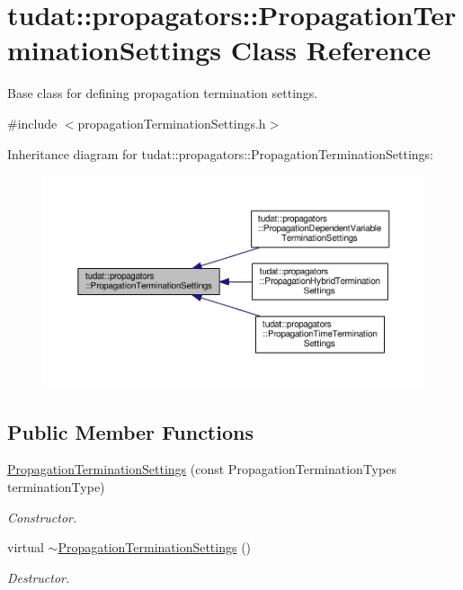 \hypertarget{classtudat_1_1propagators_1_1PropagationTerminationSettings}{}\section{tudat\+:\+:propagators\+:\+:Propagation\+Termination\+Settings Class Reference}
\label{classtudat_1_1propagators_1_1PropagationTerminationSettings}


Base class for defining propagation termination settings.  




{\ttfamily \#include $<$propagation\+Termination\+Settings.\+h$>$}



Inheritance diagram for tudat\+:\+:propagators\+:\+:Propagation\+Termination\+Settings\+:
\nopagebreak
\begin{figure}[H]
\begin{center}
\leavevmode
\includegraphics[width=350pt]{classtudat_1_1propagators_1_1PropagationTerminationSettings__inherit__graph}
\end{center}
\end{figure}
\subsection*{Public Member Functions}
\begin{DoxyCompactItemize}
\item 
\hyperlink{classtudat_1_1propagators_1_1PropagationTerminationSettings_aca59cd4b91b1da6123b4e55a6c1a0cef}{Propagation\+Termination\+Settings} (const Propagation\+Termination\+Types termination\+Type)
\begin{DoxyCompactList}\small\item\em Constructor. \end{DoxyCompactList}\item 
virtual \hyperlink{classtudat_1_1propagators_1_1PropagationTerminationSettings_aca71c6fc4cfcd0c2206cb4b850821cef}{$\sim$\+Propagation\+Termination\+Settings} ()\hypertarget{classtudat_1_1propagators_1_1PropagationTerminationSettings_aca71c6fc4cfcd0c2206cb4b850821cef}{}\label{classtudat_1_1propagators_1_1PropagationTerminationSettings_aca71c6fc4cfcd0c2206cb4b850821cef}

\begin{DoxyCompactList}\small\item\em Destructor. \end{DoxyCompactList}\end{DoxyCompactItemize}
